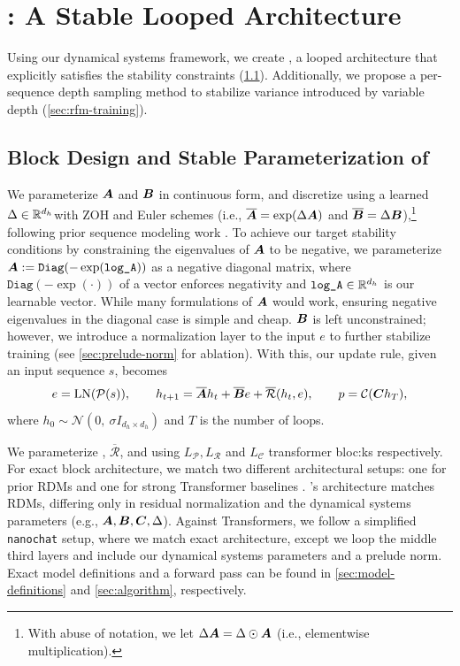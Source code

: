 \section{\sysname: A Stable Looped Architecture}
\label{sec:parcae}

Using our dynamical systems framework, we create \textbf{\emph{\sysname}}, a looped architecture that explicitly satisfies the stability constraints (\cref{sec:rfm-derivation}). 
Additionally, we propose a per-sequence depth sampling method to stabilize variance introduced by variable depth (\cref{sec:rfm-training}). 

\subsection{Block Design and Stable Parameterization of \sysname}
\label{sec:rfm-derivation}

We parameterize $\bm{A}$ and $\bm{B}$ in continuous form, and discretize using a learned $\Delta \in \mathbb{R}^{d_h}$with ZOH and Euler schemes (i.e., $\overline{\bm{A}} = \exp(\Delta \bm{A})$ and $\overline{\bm{B}} = \Delta \bm{B}$),\footnote{With abuse of notation, we let $\Delta \bm{A} = \Delta \odot \bm{A}$ (i.e., elementwise multiplication).} following prior sequence modeling work \citep{gu2024mambalineartimesequencemodeling,dao2024transformersssmsgeneralizedmodels}. 
To achieve our target stability conditions by constraining the eigenvalues of $\bm{A}$ to be negative, we parameterize $\bm{A} := \texttt{Diag}(-\exp(\texttt{log\_A}))$ as a negative diagonal matrix, where $\texttt{Diag}(-\exp(\cdot))$ of a vector enforces negativity and $\texttt{log\_A}\in \mathbb{R}^{d_h}$ is our learnable vector. 
While many formulations of $\bm{A}$ would work, ensuring negative eigenvalues in the diagonal case is simple and cheap.
$\bm{B}$ is left unconstrained; however, we introduce a normalization layer to the input $e$ to further stabilize training (see \cref{sec:prelude-norm} for ablation).
With this, our update rule, given an input sequence $s$, becomes
\begin{equation}
    e = \text{LN}(\mathcal{P}(s)), \qquad h_{t+1} = \overline{\bm{A}} h_t + \overline{\bm{B}} e + \overline{\mathcal{R}}(h_t, e), \qquad p = \mathcal{C}(\bm{C} h_T),
\end{equation}
where $h_0 \sim \mathcal{N}(0,~\sigma I_{d_h \times d_h})$ and $T$ is the number of loops.

We parameterize \prelude, $\overline{\mathcal{R}}$, and \coda using $L_{\mathcal{P}},L_{\mathcal{R}}$ and $L_{\mathcal{C}}$ transformer bloc:ks respectively. For exact block architecture, we match two different architectural setups: one for prior RDMs \citep{geiping_scaling_2025} and one for strong Transformer baselines \citep{nanochat}. \sysname's architecture matches RDMs, differing only in residual normalization and the dynamical systems parameters
(e.g., $\bm{A}, \bm{B}, \bm{C}, \Delta$). Against Transformers, we follow a simplified \texttt{nanochat} \citep{nanochat} setup, where we match exact architecture, except we loop the middle third layers and include our dynamical systems parameters and a prelude norm. Exact model definitions and a forward pass can be found in \cref{sec:model-definitions} and \cref{sec:algorithm}, respectively.


